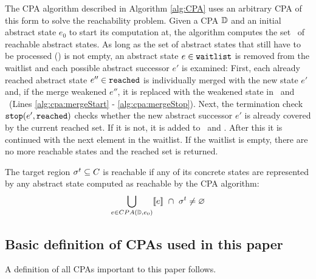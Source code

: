 The CPA algorithm \cite{Beyer2007} described in Algorithm \ref{alg:CPA} uses an arbitrary CPA of this form to solve the reachability problem.
Given a CPA $\mathbb{D}$ and an initial abstract state $e_0$ to start its computation at, the algorithm computes the set \reachedSet\ of reachable abstract states.
As long as the set of abstract states that still have to be processed (\waitlistSet) is not empty, an abstract state $e \in \texttt{waitlist}$ is removed from the waitlist
and each possible abstract successor $e'$ is examined:
First, each already reached abstract state $e'' \in \texttt{reached}$ is individually merged with the new state $e'$ and, if the merge weakened $e''$, it is replaced with the weakened state in \reachedSet\ and \waitlistSet\ (Lines \ref{alg:cpa:mergeStart} - \ref{alg:cpa:mergeStop}).
Next, the termination check $\texttt{stop}(e', \texttt{reached})$ checks whether the new abstract successor $e'$ is already covered by the current reached set.
If it is not, it is added to \waitlistSet\ and \reachedSet.
After this it is continued with the next element in the waitlist.
If the waitlist is empty, there are no more reachable states and the reached set is returned.

The target region $\sigma^{t} \subseteq C$ is reachable if any of its concrete states are represented by any abstract state computed as reachable by the CPA algorithm:
\[\bigcup_{e \in CPA(\mathbb{D}, e_0)} [\![ e ]\!]\ \cap\ \sigma^{t} \neq \varnothing\]

\subsection{Basic definition of CPAs used in this paper}
A definition of all CPAs important to this paper follows.

